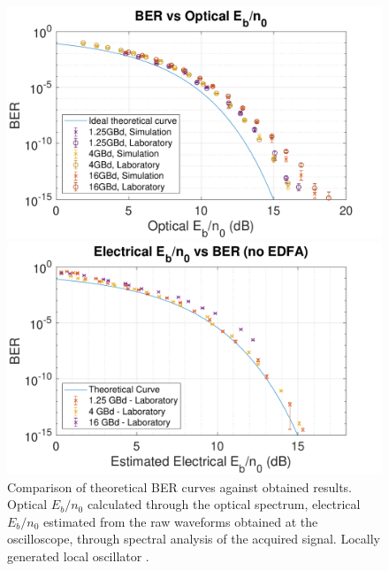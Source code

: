	\begin{figure}[H]
		\centering
		\begin{minipage}{0.49\textwidth}
			\centering
			\includegraphics[width=\textwidth]{./sdf/m_qam_system/figures/experimental/results/general/test2.pdf}
			\subcaption{\label{fig:optEbBer}}
		\end{minipage}
		\begin{minipage}{0.49\textwidth}
			\centering
			\includegraphics[width=\textwidth]{./sdf/m_qam_system/figures/experimental/results/general/test1.pdf}
			\subcaption{\label{fig:elEbBer}}
		\end{minipage}
		\caption{Comparison of theoretical BER curves against obtained results.
			Optical $E_b/n_0$ calculated through the optical spectrum, electrical
			$E_b/n_0$ estimated from the raw waveforms obtained at the oscilloscope,
			through spectral analysis of the acquired signal. Locally generated local
			oscillator .\label{fig:ebBerH}}
	\end{figure}

